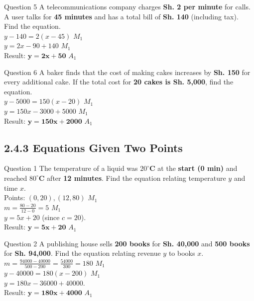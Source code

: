 \documentclass[12pt, a4paper, oneside]{article}
\begin{document}
\begin{solvingbox}{Question 5}
A telecommunications company charges \textbf{Sh. 2 per minute} for calls. A user talks for \textbf{45 minutes} and has a total bill of \textbf{Sh. 140} (including tax). Find the equation. \\
$y - 140 = 2(x - 45)$ \hfill $M_1$ \\
$y = 2x - 90 + 140$ \hfill $M_1$ \\
Result: $\mathbf{y = 2x + 50}$ \hfill $A_1$
\end{solvingbox}

\begin{solvingbox}{Question 6}
A baker finds that the cost of making cakes increases by \textbf{Sh. 150} for every additional cake. If the total cost for \textbf{20 cakes is Sh. 5,000}, find the equation. \\
$y - 5000 = 150(x - 20)$ \hfill $M_1$ \\
$y = 150x - 3000 + 5000$ \hfill $M_1$ \\
Result: $\mathbf{y = 150x + 2000}$ \hfill $A_1$
\end{solvingbox}

\newpage
\subsection*{2.4.3 Equations Given Two Points}

\begin{solvingbox}{Question 1}
The temperature of a liquid was \textbf{$20^\circ$C} at the \textbf{start (0 min)} and reached \textbf{$80^\circ$C} after \textbf{12 minutes}. Find the equation relating temperature $y$ and time $x$. \\
Points: $(0, 20), (12, 80)$ \hfill $M_1$ \\
$m = \frac{80 - 20}{12 - 0} = 5$ \hfill $M_1$ \\
$y = 5x + 20$ (since $c=20$). \\
Result: $\mathbf{y = 5x + 20}$ \hfill $A_1$
\end{solvingbox}

\begin{solvingbox}{Question 2}
A publishing house sells \textbf{200 books} for \textbf{Sh. 40,000} and \textbf{500 books} for \textbf{Sh. 94,000}. Find the equation relating revenue $y$ to books $x$. \\
$m = \frac{94000 - 40000}{500 - 200} = \frac{54000}{300} = 180$ \hfill $M_1$ \\
$y - 40000 = 180(x - 200)$ \hfill $M_1$ \\
$y = 180x - 36000 + 40000$. \\
Result: $\mathbf{y = 180x + 4000}$ \hfill $A_1$
\end{solvingbox}
\end{document}
